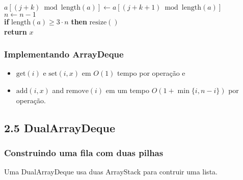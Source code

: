 \documentclass{beamer}
\begin{document}
\begin{frame}
\begin{oframed}
\begin{flushleft}
\hspace*{1em} \hspace*{1em} \hspace*{1em} \hspace*{1em} $\ensuremath{\ensuremath{\mathit{a}}[\ensuremath{(\ensuremath{\mathit{j}}+\ensuremath{\mathit{k}})\bmod \mathrm{length}(\ensuremath{\mathit{a}})}] \gets  \ensuremath{\ensuremath{\mathit{a}}[(\ensuremath{\mathit{j}}+\ensuremath{\mathit{k}}+1)\bmod \mathrm{length}(\ensuremath{\mathit{a}})]}}$\\
\hspace*{1em} \hspace*{1em} $\ensuremath{\ensuremath{\mathit{n}} \gets  \ensuremath{\ensuremath{\mathit{n}} - 1}}$\\
\hspace*{1em} \hspace*{1em} {\color{black} \textbf{if}} $\ensuremath{\mathrm{length}(\ensuremath{\mathit{a}}) \ge 3\cdot n}$ {\color{black} \textbf{then}}  $\ensuremath{\mathrm{resize}()}$\\
\hspace*{1em} \hspace*{1em} {\color{black} \textbf{return}} $\ensuremath{\ensuremath{\mathit{x}}}$\\
\end{flushleft}
\end{oframed}
\end{frame}

\begin{frame}
\frametitle{Implementando ArrayDeque}
  \begin{itemize}
    \item $\ensuremath{\ensuremath{\mathrm{get}(\ensuremath{\mathit{i}})}}$ e $\ensuremath{\ensuremath{\mathrm{set}(\ensuremath{\mathit{i}},\ensuremath{\mathit{x}})}}$ em $O(1)$ tempo por operação e
    \item $\ensuremath{\ensuremath{\mathrm{add}(\ensuremath{\mathit{i}},\ensuremath{\mathit{x}})}}$ and $\ensuremath{\ensuremath{\mathrm{remove}(\ensuremath{\mathit{i}})}}$ em um tempo $O(1+\min\{\ensuremath{\ensuremath{\ensuremath{\mathit{i}}}},\ensuremath{\ensuremath{\ensuremath{\mathit{n}}}}-\ensuremath{\ensuremath{\ensuremath{\mathit{i}}}}\})$  por operação.
  \end{itemize}
\end{frame}

\subsection{2.5 DualArrayDeque}
\begin{frame}
\frametitle{Construindo uma fila com duas pilhas}

Uma DualArrayDeque usa duas ArrayStack para contruir uma lista.
\end{frame}
\end{document}

